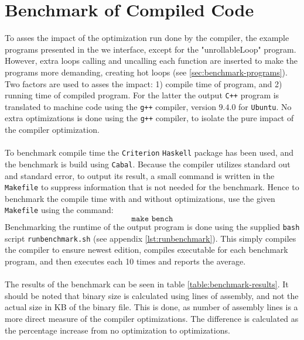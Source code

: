 \section{Benchmark of Compiled Code \rr}
To asses the impact of the optimization run done by the \lan compiler, the
example programs presented in the we interface, except for the "unrollableLoop" program.
However, extra loops calling and uncalling each function are inserted to make the programs
more demanding, creating hot loops
(see \ref{sec:benchmark-programs}). Two factors are used to asses the impact: 1) compile time
of program, and 2) running time of compiled program. For the latter the output \texttt{C++}
program is translated to machine code using the \texttt{g++} compiler, version $9.4.0$
for \texttt{Ubuntu}. No extra optimizations is done using the \texttt{g++} compiler, to
isolate the pure impact of the \lan compiler optimization.
\\
\\
To benchmark compile time the \texttt{Criterion} \texttt{Haskell} package has been used,
and the benchmark is build using \texttt{Cabal}. Because the \lan compiler utilizes
standard out and standard error, to output its result, a small command is written in the
\texttt{Makefile} to suppress information that is not needed for the benchmark. Hence
to benchmark the compile time with and without optimizations, use the given
\texttt{Makefile} using the command:
$$\texttt{make bench}$$
\noindent
Benchmarking the runtime of the output program is done using the supplied \texttt{bash}
script \texttt{runbenchmark.sh} (see appendix \ref{lst:runbenchmark}). This simply compiles
the \lan compiler to ensure newest edition, compiles executable for each benchmark program,
and then executes each 10 times and reports the average.
\\
\\
The results of the benchmark can be seen in table \ref{table:benchmark-results}.
It should be noted that binary size is calculated using lines of assembly, and not the
actual size in KB of the binary file. This is done, as number of assembly lines is a
more direct measure of the \lan compiler optimizations. The difference is calculated as
the percentage increase from no optimization to optimizations.

